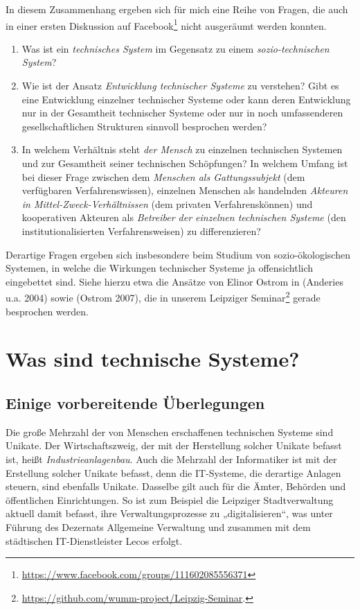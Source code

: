 \documentclass[11pt,a4paper]{article}
\begin{document}
In diesem Zusammenhang ergeben sich für mich eine Reihe von Fragen, die auch
in einer ersten Diskussion auf
Facebook\footnote{\url{https://www.facebook.com/groups/111602085556371}} nicht
ausgeräumt werden konnten.
\begin{enumerate}
\item Was ist ein \emph{technisches System} im Gegensatz zu einem
  \emph{sozio-technischen System}?
\item Wie ist der Ansatz \emph{Entwicklung technischer Systeme} zu verstehen?
  Gibt es eine Entwicklung einzelner technischer Systeme oder kann deren
  Entwicklung nur in der Gesamtheit technischer Systeme oder nur in noch
  umfassenderen gesellschaftlichen Strukturen sinnvoll besprochen werden?
\item In welchem Verhältnis steht \emph{der Mensch} zu einzelnen technischen
  Systemen und zur Gesamtheit seiner technischen Schöpfungen? In welchem
  Umfang ist bei dieser Frage zwischen dem \emph{Menschen als Gattungssubjekt}
  (dem verfügbaren Verfahrenswissen), einzelnen Menschen als handelnden
  \emph{Akteuren in Mittel-Zweck-Verhältnissen} (dem privaten
  Verfahrenskönnen) und kooperativen Akteuren als \emph{Betreiber der
    einzelnen technischen Systeme} (den institutionalisierten
  Verfahrensweisen) zu differenzieren?
\end{enumerate}

Derartige Fragen ergeben sich insbesondere beim Studium von sozio-ökologischen
Systemen, in welche die Wirkungen technischer Systeme ja offensichtlich
eingebettet sind.  Siehe hierzu etwa die Ansätze von Elinor Ostrom in
(Anderies u.a. 2004) sowie (Ostrom 2007), die in unserem Leipziger
Seminar\footnote{\url{https://github.com/wumm-project/Leipzig-Seminar}.}
gerade besprochen werden.

\section{Was sind technische Systeme?}

\subsection{Einige vorbereitende Überlegungen}

Die große Mehrzahl der von Menschen erschaffenen technischen Systeme sind
Unikate. Der Wirtschaftszweig, der mit der Herstellung solcher Unikate befasst
ist, heißt \emph{Industrieanlagenbau}. Auch die Mehrzahl der Informatiker ist
mit der Erstellung solcher Unikate befasst, denn die IT-Systeme, die derartige
Anlagen steuern, sind ebenfalls Unikate.  Dasselbe gilt auch für die Ämter,
Behörden und öffentlichen Einrichtungen. So ist zum Beispiel die Leipziger
Stadtverwaltung aktuell damit befasst, ihre Verwaltungsprozesse zu
„digitalisieren“, was unter Führung des Dezernats Allgemeine Verwaltung und
zusammen mit dem städtischen IT-Dienstleister Lecos erfolgt.
\end{document}
